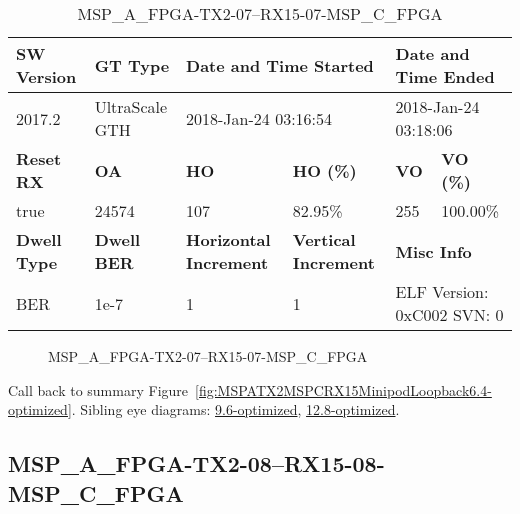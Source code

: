 \begin{table}[h]
\centering
\caption{MSP\_A\_FPGA-TX2-07--RX15-07-MSP\_C\_FPGA}
\label{tab:MSPAFPGATX207RX1507MSPCFPGA6.4-optimized}
\begin{tabular}{@{}|l|l|l|l|l|l|@{}}
\toprule
\textbf{SW Version}                & \textbf{GT Type}   & \multicolumn{2}{l|}{\textbf{Date and Time Started}}            & \multicolumn{2}{l|}{\textbf{Date and Time Ended}}        \\ \midrule
2017.2                       & UltraScale GTH          & \multicolumn{2}{l|}{2018-Jan-24 03:16:54}                   & \multicolumn{2}{l|}{2018-Jan-24 03:18:06}               \\ \midrule
\textbf{Reset RX}                  & \textbf{OA} & \textbf{HO}   & \textbf{HO (\%)} & \textbf{VO} & \textbf{VO (\%)} \\ \midrule
true & 24574        & 107          & 82.95\%        & 255        & 100.00\%       \\ \midrule
\textbf{Dwell Type}                & \textbf{Dwell BER} & \textbf{Horizontal Increment} & \textbf{Vertical Increment}    & \multicolumn{2}{l|}{\textbf{Misc Info}}                  \\ \midrule
BER                            & 1e-7        & 1        & 1           & \multicolumn{2}{l|}{ELF Version: 0xC002 SVN: 0}                         \\ \bottomrule
\end{tabular}
\end{table}

\begin{figure}[h]
\caption{MSP\_A\_FPGA-TX2-07--RX15-07-MSP\_C\_FPGA} \label{fig:MSPAFPGATX207RX1507MSPCFPGA6.4-optimized}
\end{figure}

Call back to summary Figure~\ref{fig:MSPATX2MSPCRX15MinipodLoopback6.4-optimized}.
Sibling eye diagrams: \hyperref[sec:MSPAFPGATX207RX1507MSPCFPGA9.6-optimized]{9.6-optimized}, \hyperref[sec:MSPAFPGATX207RX1507MSPCFPGA12.8-optimized]{12.8-optimized}.

\clearpage
\newpage


\subsection{MSP\_A\_FPGA-TX2-08--RX15-08-MSP\_C\_FPGA}\label{sec:MSPAFPGATX208RX1508MSPCFPGA6.4-optimized}

